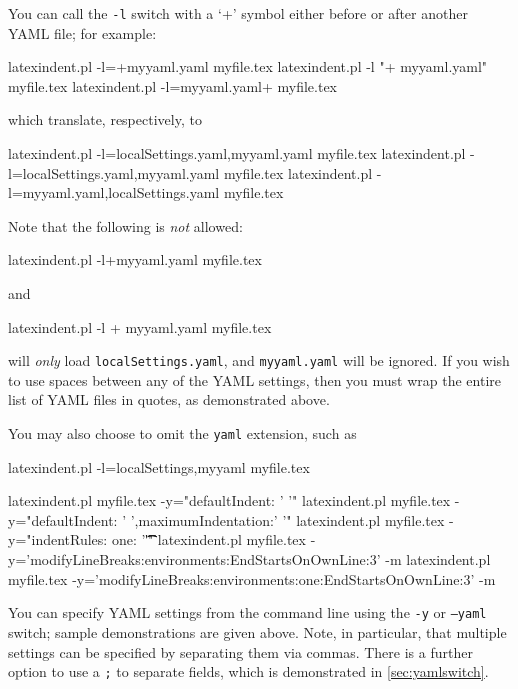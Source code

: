 	You can call the \texttt{-l} switch with a `+' symbol either before or after
	 another YAML file; for example:
	\begin{commandshell}
latexindent.pl -l=+myyaml.yaml myfile.tex
latexindent.pl -l "+ myyaml.yaml" myfile.tex
latexindent.pl -l=myyaml.yaml+  myfile.tex
\end{commandshell}
	which translate, respectively, to
	\begin{commandshell}
latexindent.pl -l=localSettings.yaml,myyaml.yaml myfile.tex
latexindent.pl -l=localSettings.yaml,myyaml.yaml myfile.tex
latexindent.pl -l=myyaml.yaml,localSettings.yaml myfile.tex
\end{commandshell}
	Note that the following is \emph{not} allowed:
	\begin{commandshell}
latexindent.pl -l+myyaml.yaml myfile.tex
\end{commandshell}
	and
	\begin{commandshell}
latexindent.pl -l + myyaml.yaml myfile.tex
\end{commandshell}
	will \emph{only} load \texttt{localSettings.yaml}, and \texttt{myyaml.yaml} will be
	ignored. If you wish to use spaces between any of the YAML settings, then you must wrap
	the entire list of YAML files in quotes, as demonstrated above.

	You may also choose to omit the \texttt{yaml} extension, such
	as%
	\begin{commandshell}
latexindent.pl -l=localSettings,myyaml myfile.tex
\end{commandshell}
	\begin{commandshell}
latexindent.pl myfile.tex -y="defaultIndent: ' '"
latexindent.pl myfile.tex -y="defaultIndent: ' ',maximumIndentation:' '"
latexindent.pl myfile.tex -y="indentRules: one: '\t\t\t\t'"
latexindent.pl myfile.tex -y='modifyLineBreaks:environments:EndStartsOnOwnLine:3' -m
latexindent.pl myfile.tex -y='modifyLineBreaks:environments:one:EndStartsOnOwnLine:3' -m
\end{commandshell}
	\label{page:yamlswitch}You%
	 can specify YAML settings from the command line
	using the \texttt{-y} or \texttt{--yaml} switch; sample demonstrations are given above.
	Note, in particular, that multiple settings can be specified by separating them via
	commas. There is a further option to use a \texttt{;} to separate fields, which is
	demonstrated in \vref{sec:yamlswitch}.

